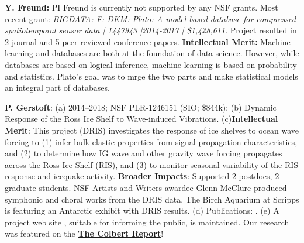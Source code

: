 
{\bf Y. Freund:} PI Freund is currently not supported by any
NSF grants. Most recent grant: {\em BIGDATA: F: DKM: Plato: A
  model-based database for compressed spatiotemporal sensor data
 | 1447943 |2014-2017 | \$1,428,611}. Project resulted in 2 journal
and 5 peer-reviewed conference papers. {\bf Intellectual Merit:}
Machine learning and databases are both at the foundation of data
science. However, while databases are based on logical inference,
machine learning is based on probability and statistics. Plato's goal
was to mrge the two parts and make statistical models an integral part
of databases.


{\bf  P. Gerstoft}: (a) 2014--2018; NSF PLR-1246151 (SIO; \$844k); (b) Dynamic Response of the Ross Ice Shelf to Wave-induced Vibrations. (c){\bf Intellectual Merit}: This project (DRIS) investigates the response of ice shelves to ocean wave forcing to (1) infer bulk elastic properties from signal propagation characteristics, and (2) to determine how IG wave and other gravity wave forcing propagates across the Ross Ice Shelf (RIS), and (3) to monitor seasonal variability of the RIS response and icequake activity. 
{\bf Broader Impacts}: Supported 2 postdocs, 2 graduate students. NSF Artists and Writers awardee Glenn McClure produced symphonic and choral works from the DRIS data. The Birch Aquarium at Scripps is featuring an Antarctic exhibit with DRIS results. (d) Publications: \cite{bromirski2015,diez2016,bromirski2017,chen2018,shen2018,chaput2018,white2019}. 
(e) A project web site \href{https://scripps.ucsd.edu/centers/iceshelfvibes/}, suitable for informing the public, is maintained. 
Our research was featured on the %
\href{https://www.youtube.com/watch?v=djesneud0Yg&fbclid=IwAR1zgpupmvZv2lFUy2ce2bLAgpIvi0M7OBW7P0koa0VwpwfMg5-8Pyg9hwE&app=desktop}{\bf The Colbert Report}!


